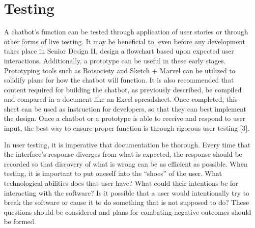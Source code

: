 \documentclass[titlepage, 12pt]{article}
\begin{document}
\pagebreak



\section{Testing}

A chatbot’s function can be tested through application of user stories or through other forms of live testing. It may be beneficial to, even before any development takes place in Senior Design II, design a flowchart based upon expected user interactions. Additionally, a prototype can be useful in these early stages. Prototyping tools such as Botsociety and Sketch + Marvel can be utilized to solidify plans for how the chatbot will function. It is also recommended that content required for building the chatbot, as previously described, be compiled and compared in a document like an Excel spreadsheet. Once completed, this sheet can be used as instruction for developers, so that they can best implement the design. Once a chatbot or a prototype is able to receive and respond to user input, the best way to ensure proper function is through rigorous user testing [3].
 
In user testing, it is imperative that documentation be thorough. Every time that the interface’s response diverges from what is expected, the response should be recorded so that discovery of what is wrong can be as efficient as possible. When testing, it is important to put oneself into the “shoes” of the user. What technological abilities does that user have? What could their intentions be for interacting with the software? Is it possible that a user would intentionally try to break the software or cause it to do something that is not supposed to do? These questions should be considered and plans for combating negative outcomes should be formed.
\end{document}
